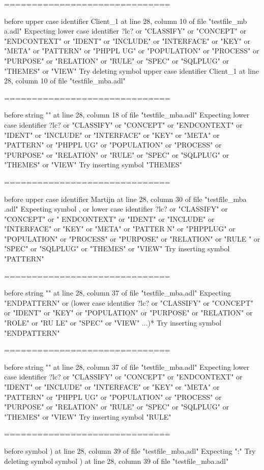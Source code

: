\begin{description}
\begin{haskell}
==============================

before upper case identifier Client_1 at line 28, column 10 of file "testfile_mb
a.adl"
Expecting lower case identifier ?lc? or "CLASSIFY" or "CONCEPT" or "ENDCONTEXT"
or "IDENT" or "INCLUDE" or "INTERFACE" or "KEY" or "META" or "PATTERN" or "PHPPL
UG" or "POPULATION" or "PROCESS" or "PURPOSE" or "RELATION" or "RULE" or "SPEC"
or "SQLPLUG" or "THEMES" or "VIEW"
Try deleting symbol upper case identifier Client_1 at line 28, column 10 of file
 "testfile_mba.adl"

==============================

before string "" at line 28, column 18 of file "testfile_mba.adl"
Expecting lower case identifier ?lc? or "CLASSIFY" or "CONCEPT" or "ENDCONTEXT"
or "IDENT" or "INCLUDE" or "INTERFACE" or "KEY" or "META" or "PATTERN" or "PHPPL
UG" or "POPULATION" or "PROCESS" or "PURPOSE" or "RELATION" or "RULE" or "SPEC"
or "SQLPLUG" or "THEMES" or "VIEW"
Try inserting symbol "THEMES"

==============================

before upper case identifier Martijn at line 28, column 30 of file "testfile_mba
.adl"
Expecting symbol , or lower case identifier ?lc? or "CLASSIFY" or "CONCEPT" or "
ENDCONTEXT" or "IDENT" or "INCLUDE" or "INTERFACE" or "KEY" or "META" or "PATTER
N" or "PHPPLUG" or "POPULATION" or "PROCESS" or "PURPOSE" or "RELATION" or "RULE
" or "SPEC" or "SQLPLUG" or "THEMES" or "VIEW"
Try inserting symbol "PATTERN"

==============================

before string "" at line 28, column 37 of file "testfile_mba.adl"
Expecting "ENDPATTERN" or (lower case identifier ?lc? or "CLASSIFY" or "CONCEPT"
 or "IDENT" or "KEY" or "POPULATION" or "PURPOSE" or "RELATION" or "ROLE" or "RU
LE" or "SPEC" or "VIEW" ...)*
Try inserting symbol "ENDPATTERN"

==============================

before string "" at line 28, column 37 of file "testfile_mba.adl"
Expecting lower case identifier ?lc? or "CLASSIFY" or "CONCEPT" or "ENDCONTEXT"
or "IDENT" or "INCLUDE" or "INTERFACE" or "KEY" or "META" or "PATTERN" or "PHPPL
UG" or "POPULATION" or "PROCESS" or "PURPOSE" or "RELATION" or "RULE" or "SPEC"
or "SQLPLUG" or "THEMES" or "VIEW"
Try inserting symbol "RULE"

==============================

before symbol ) at line 28, column 39 of file "testfile_mba.adl"
Expecting ":"
Try deleting symbol symbol ) at line 28, column 39 of file "testfile_mba.adl"


\end{haskell}
\end{description}

